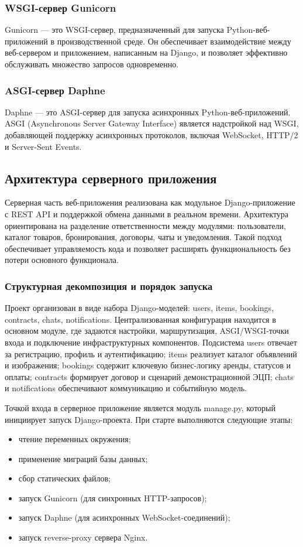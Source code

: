 \subsubsection{WSGI-сервер Gunicorn}
Gunicorn — это WSGI-сервер, предназначенный для запуска Python-веб-приложений в производственной среде. Он обеспечивает взаимодействие между веб-сервером и приложением, написанным на Django, и позволяет эффективно обслуживать множество запросов одновременно.
\subsubsection{ASGI-сервер Daphne}
Daphne — это ASGI-сервер для запуска асинхронных Python-веб-приложений. ASGI (Asynchronous Server Gateway Interface) является надстройкой над WSGI, добавляющей поддержку асинхронных протоколов, включая WebSocket, HTTP/2 и Server-Sent Events.

\subsection{Архитектура серверного приложения}
Серверная часть веб-приложения реализована как модульное Django-приложение с REST API и поддержкой обмена данными в реальном времени. Архитектура ориентирована на разделение ответственности между модулями: пользователи, каталог товаров, бронирования, договоры, чаты и уведомления. Такой подход обеспечивает управляемость кода и позволяет расширять функциональность без потери основного функционала.

\subsubsection{Структурная декомпозиция и порядок запуска}
Проект организован в виде набора Django-моделей: users, items, bookings, contracts, chats, notifications. Централизованная конфигурация находится в основном модуле, где задаются настройки, маршрутизация, ASGI/WSGI-точки входа и подключение инфраструктурных компонентов.
Подсистема users отвечает за регистрацию, профиль и аутентификацию; items реализует каталог объявлений и изображения; bookings содержит ключевую бизнес-логику аренды, статусов и оплаты; contracts формирует договор и сценарий демонстрационной ЭЦП; chats и notifications обеспечивают коммуникацию и событийную модель.

Точкой входа в серверное приложение является модуль manage.py, который инициирует запуск Django-проекта. При старте выполняются следующие этапы:
\begin{itemize}
    \item чтение переменных окружения;
    \item применение миграций базы данных;
    \item сбор статических файлов;
    \item запуск Gunicorn (для синхронных HTTP-запросов);
    \item запуск Daphne (для асинхронных WebSocket-соединений);
    \item запуск reverse-proxy сервера Nginx.
\end{itemize}

